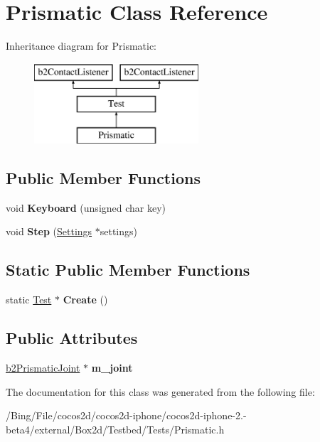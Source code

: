 \hypertarget{class_prismatic}{\section{Prismatic Class Reference}
\label{class_prismatic}
}
Inheritance diagram for Prismatic\-:\begin{figure}[H]
\begin{center}
\leavevmode
\includegraphics[height=3.000000cm]{class_prismatic}
\end{center}
\end{figure}
\subsection*{Public Member Functions}
\begin{DoxyCompactItemize}
\item 
\hypertarget{class_prismatic_ae1a5fcbdef5e95e9bb9fab52291e656a}{void {\bfseries Keyboard} (unsigned char key)}\label{class_prismatic_ae1a5fcbdef5e95e9bb9fab52291e656a}

\item 
\hypertarget{class_prismatic_a0c5f4ebf969ab0420a1873c1c8fc4181}{void {\bfseries Step} (\hyperlink{struct_settings}{Settings} $\ast$settings)}\label{class_prismatic_a0c5f4ebf969ab0420a1873c1c8fc4181}

\end{DoxyCompactItemize}
\subsection*{Static Public Member Functions}
\begin{DoxyCompactItemize}
\item 
\hypertarget{class_prismatic_aa4e5e056bab552ace418a0fbd7c4e863}{static \hyperlink{class_test}{Test} $\ast$ {\bfseries Create} ()}\label{class_prismatic_aa4e5e056bab552ace418a0fbd7c4e863}

\end{DoxyCompactItemize}
\subsection*{Public Attributes}
\begin{DoxyCompactItemize}
\item 
\hypertarget{class_prismatic_a61e52bb77d5908be42e5109deecb1c19}{\hyperlink{classb2_prismatic_joint}{b2\-Prismatic\-Joint} $\ast$ {\bfseries m\-\_\-joint}}\label{class_prismatic_a61e52bb77d5908be42e5109deecb1c19}

\end{DoxyCompactItemize}


The documentation for this class was generated from the following file\-:\begin{DoxyCompactItemize}
\item 
/\-Bing/\-File/cocos2d/cocos2d-\/iphone/cocos2d-\/iphone-\/2.-\/beta4/external/\-Box2d/\-Testbed/\-Tests/Prismatic.\-h\end{DoxyCompactItemize}
